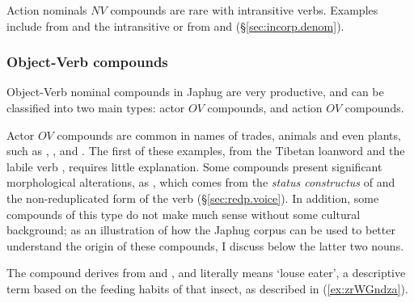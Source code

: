 Action nominals $NV$ compounds are rare with intransitive verbs. Examples include  from  and the intransitive  or  from   and  (§\ref{sec:incorp.denom}).


\subsubsection{Object-Verb compounds} \label{sec:object.verb.compounds}
Object-Verb nominal compounds in Japhug are very productive, and can be classified into two main types: actor $OV$ compounds, and action $OV$ compounds.

Actor $OV$ compounds are common in names of trades, animals and even plants, such as , ,  and . The first of these examples, from the Tibetan loanword  and the labile verb , requires little explanation. Some compounds present significant morphological alterations, as  , which comes from the \textit{status constructus} of  and the non-reduplicated form of the verb  (§\ref{sec:redp.voice}). In addition, some compounds of this type do not make much sense without some cultural background; as an illustration of how the Japhug corpus can be used to better understand the origin of these compounds, I discuss below the latter two nouns.

The compound  derives from  and , and literally means `louse eater', a descriptive term based on the feeding habits of that insect, as described in (\ref{ex:zrWGndza}).

